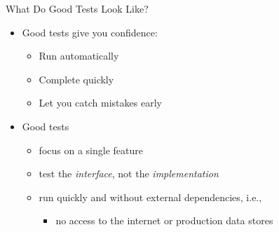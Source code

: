 \documentclass[
ps,
]{prosper}
\begin{document}
\begin{slide}{What Do Good Tests Look Like?}

\begin{itemize}
  
\item Good tests give you confidence:

  \begin{itemize}
  \item Run automatically
  \item Complete quickly
  \item Let you catch mistakes early
  \end{itemize}

\item Good tests

  \begin{itemize}
  \item focus on a single feature
  \item test the \textit{interface}, not the \textit{implementation}
  \item run quickly and without external dependencies, i.e.,

    \begin{itemize}
      
      \item no access to the internet or production data stores

    \end{itemize}
    
  \end{itemize}

\end{itemize}
  
\end{slide}
\end{document}

